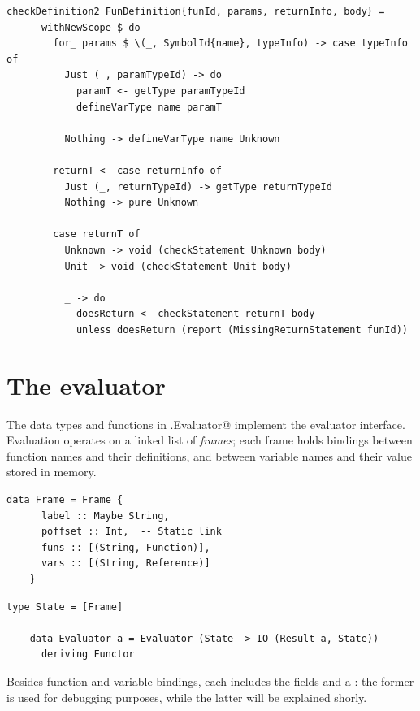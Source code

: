 \documentclass[UdineBachThesis,american,11pt]{PhdThesis}
\begin{document}
  \begin{lstlisting}[gobble=4,basicstyle=\ttfamily\small]
    checkDefinition2 FunDefinition{funId, params, returnInfo, body} =
      withNewScope $ do
        for_ params $ \(_, SymbolId{name}, typeInfo) -> case typeInfo of
          Just (_, paramTypeId) -> do
            paramT <- getType paramTypeId
            defineVarType name paramT

          Nothing -> defineVarType name Unknown

        returnT <- case returnInfo of
          Just (_, returnTypeId) -> getType returnTypeId
          Nothing -> pure Unknown

        case returnT of
          Unknown -> void (checkStatement Unknown body)
          Unit -> void (checkStatement Unit body)

          _ -> do
            doesReturn <- checkStatement returnT body
            unless doesReturn (report (MissingReturnStatement funId))
  \end{lstlisting}

  \section{The evaluator}

  The data types and functions in \lstinline@Devin.Evaluator@ implement the
  evaluator interface. Evaluation operates on a linked list of \emph{frames};
  each frame holds bindings between function names and their definitions, and
  between variable names and their value stored in memory.

  \begin{lstlisting}[gobble=4,basicstyle=\ttfamily\small]
    data Frame = Frame {
      label :: Maybe String,
      poffset :: Int,  -- Static link
      funs :: [(String, Function)],
      vars :: [(String, Reference)]
    }
  \end{lstlisting}

  \pagebreak

  \begin{lstlisting}[gobble=4,basicstyle=\ttfamily\small]
    type State = [Frame]

    data Evaluator a = Evaluator (State -> IO (Result a, State))
      deriving Functor
  \end{lstlisting}

  Besides function and variable bindings, each \lstinline@Frame@ includes the
  fields \lstinline@label@ and a \lstinline@poffset@: the former is used for
  debugging purposes, while the latter will be explained shorly.
\end{document}
